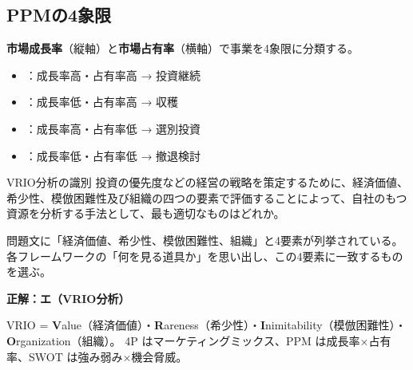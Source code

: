 \begin{hikaku}[戦略フレームワークの引き出し]
\end{hikaku}

\subsection{PPMの4象限}

\begin{teigi}
\textbf{市場成長率}（縦軸）と\textbf{市場占有率}（横軸）で事業を4象限に分類する。
\begin{itemize}
  \item {}：成長率高・占有率高 → 投資継続
  \item {}：成長率低・占有率高 → 収穫
  \item {}：成長率高・占有率低 → 選別投資
  \item {}：成長率低・占有率低 → 撤退検討
\end{itemize}
\end{teigi}

\begin{reidai}{VRIO分析の識別}
投資の優先度などの経営の戦略を策定するために、経済価値、希少性、模倣困難性及び組織の四つの要素で評価することによって、自社のもつ資源を分析する手法として、最も適切なものはどれか。

\end{reidai}

\begin{shishin}
問題文に「経済価値、希少性、模倣困難性、組織」と4要素が列挙されている。
各フレームワークの「何を見る道具か」を思い出し、この4要素に一致するものを選ぶ。
\end{shishin}

\begin{kaitou}
\textbf{正解：エ（VRIO分析）}

VRIO = \textbf{V}alue（経済価値）・\textbf{R}areness（希少性）・\textbf{I}nimitability（模倣困難性）・\textbf{O}rganization（組織）。
4P はマーケティングミックス、PPM は成長率×占有率、SWOT は強み弱み×機会脅威。
\end{kaitou}

